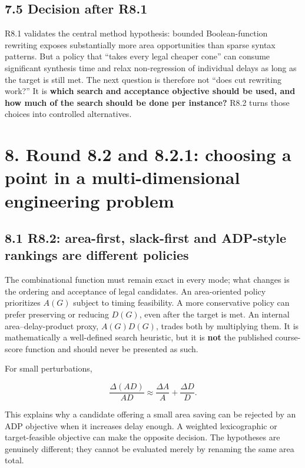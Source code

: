\documentclass[a4paper,10pt]{article}
\theoremstyle{definition}
\theoremstyle{remark}
\newcounter{problem}
\begin{document}
\subsection{7.5 Decision after R8.1}\label{decision-after-r8.1}

R8.1 validates the central method hypothesis: bounded Boolean-function rewriting exposes substantially more area opportunities than sparse syntax patterns. But a policy that ``takes every legal cheaper cone'' can consume significant synthesis time and relax non-regression of individual delays as long as the target is still met. The next question is therefore not ``does cut rewriting work?'' It is \textbf{which search and acceptance objective should be used, and how much of the search should be done per instance?} R8.2 turns those choices into controlled alternatives.

\section{8. Round 8.2 and 8.2.1: choosing a point in a multi-dimensional engineering problem}\label{round-8.2-and-8.2.1-choosing-a-point-in-a-multi-dimensional-engineering-problem}

\subsection{8.1 R8.2: area-first, slack-first and ADP-style rankings are different policies}\label{r8.2-area-first-slack-first-and-adp-style-rankings-are-different-policies}

The combinational function must remain exact in every mode; what changes is the ordering and acceptance of legal candidates. An area-oriented policy prioritizes \(A(G)\) subject to timing feasibility. A more conservative policy can prefer preserving or reducing \(D(G)\), even after the target is met. An internal area--delay-product proxy, \(A(G)D(G)\), trades both by multiplying them. It is mathematically a well-defined search heuristic, but it is \textbf{not} the published course-score function and should never be presented as such.

For small perturbations,

\[
\frac{\Delta(AD)}{AD}\approx\frac{\Delta A}{A}+\frac{\Delta D}{D}.
\]

This explains why a candidate offering a small area saving can be rejected by an ADP objective when it increases delay enough. A weighted lexicographic or target-feasible objective can make the opposite decision. The hypotheses are genuinely different; they cannot be evaluated merely by renaming the same area total.
\end{document}
